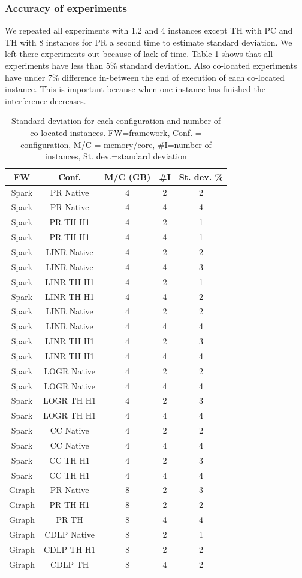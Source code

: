 \subsubsection{Accuracy of experiments}

We repeated all experiments with 1,2 and 4 instances except TH with PC and TH with 8 instances for PR a second time to estimate standard deviation. We left there experiments out because of lack of time. Table \ref{tab:std-dev} shows that 
all experiments have less than 5\% standard deviation. Also co-located experiments have under 7\% difference in-between the end of execution of each co-located instance. This is important because when one instance has finished the interference decreases.

\begin{table}[thbp]
  \centering
  \caption{Standard deviation for each configuration and number of co-located instances.
	FW=framework, Conf. = configuration, M/C = memory/core, #I=number of instances, St. dev.=standard deviation}
  \label{tab:std-dev}
  \begin{tabular}{|c|c|c|c|c|}
    \hline
	  \textbf{FW} & \textbf{Conf.} & \textbf{M/C (GB)} & \textbf{\#I} & \textbf{St. dev. \%} \\
    \hline
	  Spark & PR Native & 4 & 2 & 2\\
	  Spark & PR Native & 4 & 4 & 4\\
	  Spark & PR TH H1 & 4 & 2 & 1 \\
	  Spark & PR TH H1 & 4 & 4 & 1 \\
	  Spark & LINR Native & 4 & 2 & 2 \\
	  Spark & LINR Native & 4 & 4 & 3 \\
	  Spark & LINR TH H1 & 4 & 2 & 1 \\
	  Spark & LINR TH H1 & 4 & 4 & 2 \\
	  Spark & LINR Native & 4 & 2 & 2 \\
	  Spark & LINR Native & 4 & 4 & 4 \\
	  Spark & LINR TH H1 & 4 & 2 & 3 \\
	  Spark & LINR TH H1 & 4 & 4 & 4 \\
	  Spark & LOGR Native & 4 & 2 & 2 \\
	  Spark & LOGR Native & 4 & 4 & 4 \\
	  Spark & LOGR TH H1 & 4 & 2 & 3 \\
	  Spark & LOGR TH H1 & 4 & 4 & 4 \\ 
	  Spark & CC Native & 4 & 2 & 2 \\
	  Spark & CC Native & 4 & 4 & 4 \\
	  Spark & CC TH H1 & 4 & 2 & 3 \\
	  Spark & CC TH H1 & 4 & 4 & 4 \\ 
	  Giraph & PR Native & 8 & 2 & 3 \\
	  Giraph & PR TH H1 & 8 & 2 & 2 \\
	  Giraph & PR TH & 8 & 4 & 4 \\
	  Giraph & CDLP Native & 8 & 2 & 1 \\
	  Giraph & CDLP TH H1 & 8 & 2 & 2 \\
	  Giraph & CDLP TH & 8 & 4 & 2 \\


\end{tabular}
\end{table}
